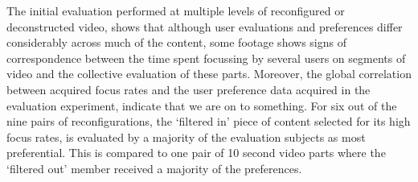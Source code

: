 The initial evaluation performed at multiple levels of reconfigured or deconstructed video, shows that although user evaluations and preferences differ considerably across much of the content, some footage shows signs of correspondence between the time spent focussing by several users on segments of video and the collective evaluation of these parts. Moreover, the global correlation between acquired focus rates and the user preference data acquired in the evaluation experiment, indicate that we are on to something. For six out of the nine pairs of reconfigurations, the `filtered in' piece of content selected for its high focus rates, is evaluated by a majority of the evaluation subjects as most preferential. This is compared to one pair of 10 second video parts where the `filtered out' member received a majority of the preferences.








